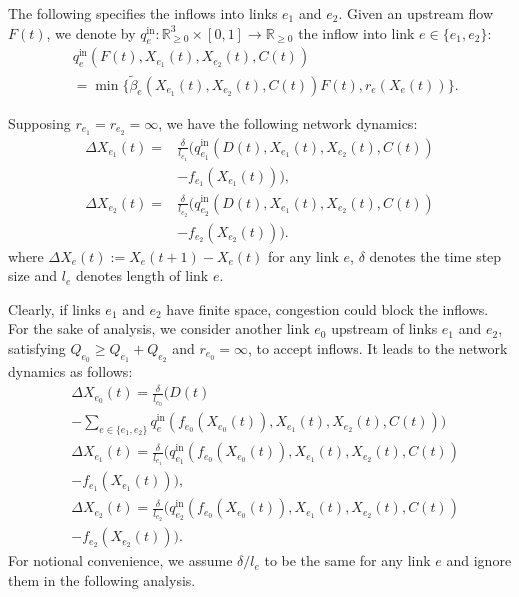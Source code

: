 The following specifies the inflows into links $e_1$ and $e_2$. Given an upstream flow $F(t)$, we denote by $q_e^{\mathrm{in}}:\mathbb{R}_{\geq0}^3\times[0,1]\to\mathbb{R}_{\geq0}$ the inflow into link $e\in\{e_1,e_2\}$:
\begin{align}
&q_e^{\mathrm{in}}(F(t), X_{e_1}(t), X_{e_2}(t), C(t)) \nonumber \\
&= \min\{\tilde{\beta}_e(X_{e_1}(t), X_{e_2}(t), C(t)) F(t), r_{e}(X_{e}(t))\}.
\end{align}

Supposing $r_{e_1}=r_{e_2}=\infty$, we have the following network dynamics:
\begin{subequations}
    \begin{align}
        \Delta X_{e_1}(t) =& \frac{\delta}{l_{e_1}}\Big(q_{e_1}^{\mathrm{in}}(D(t), X_{e_1}(t), X_{e_2}(t), C(t)) \nonumber \\ 
        & - f_{e_1}(X_{e_1}(t))\Big), \label{eq_inf_1} \\
        \Delta X_{e_2}(t) =& \frac{\delta}{l_{e_2}}\Big(q_{e_2}^{\mathrm{in}}(D(t), X_{e_1}(t), X_{e_2}(t), C(t)) \nonumber \\ 
        & - f_{e_2}(X_{e_2}(t))\Big). \label{eq_inf_2}
    \end{align}
\end{subequations}
where $\Delta X_e(t):=X_e(t+1)-X_e(t)$ for any link $e$, $\delta$ denotes the time step size and $l_e$ denotes length of link $e$.

Clearly, if links $e_1$ and $e_2$ have finite space, congestion could block the inflows. For the sake of analysis, we consider another link $e_0$ upstream of links $e_1$ and $e_2$, satisfying $Q_{e_0}\geq Q_{e_1}+Q_{e_2}$ and $r_{e_0}=\infty$, to accept inflows. It leads to the network dynamics as follows:
\begin{subequations}
    \begin{align}
        &\Delta X_{e_0}(t) = \frac{\delta}{l_{e_0}}\Big(D(t) \nonumber \\
        &-\sum_{e\in\{e_1,e_2\}} q_e^{\mathrm{in}}(f_{e_0}(X_{e_0}(t)), X_{e_1}(t), X_{e_2}(t), C(t)) \Big) \label{eq_fin_1} \\
        &\Delta X_{e_1}(t) = \frac{\delta}{l_{e_1}}\Big(q_{e_1}^{\mathrm{in}}(f_{e_0}(X_{e_0}(t)), X_{e_1}(t), X_{e_2}(t), C(t)) \nonumber \\
        & - f_{e_1}(X_{e_1}(t))\Big), \label{eq_fin_2}  \\
        &\Delta X_{e_2}(t) = \frac{\delta}{l_{e_2}}\Big(q_{e_2}^{\mathrm{in}}(f_{e_0}(X_{e_0}(t)), X_{e_1}(t), X_{e_2}(t), C(t)) \nonumber \\
        &-f_{e_2}(X_{e_2}(t))\Big). \label{eq_fin_3} 
    \end{align}
\end{subequations}
For notional convenience, we assume $\delta/l_e$  to be the same for any link $e$ and ignore them in the following analysis.


